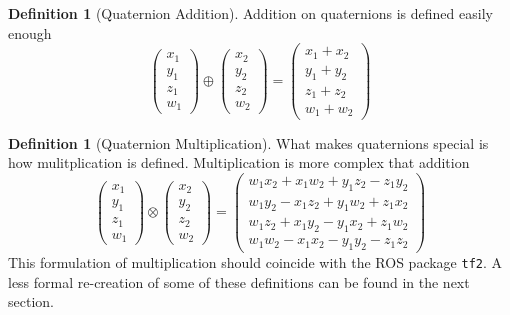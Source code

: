 \documentclass{amsart}
\theoremstyle{definition}
\newtheorem{definition}[theorem]{Definition}
\theoremstyle{remark}
\numberwithin{equation}{section}
\begin{document}
\begin{definition}[Quaternion Addition]
  Addition on quaternions is defined easily enough
  \begin{equation}
    \begin{pmatrix}
      x_1 \\
      y_1 \\
      z_1 \\
      w_1
    \end{pmatrix} \oplus
    \begin{pmatrix}
      x_2 \\
      y_2 \\
      z_2 \\
      w_2
    \end{pmatrix} =
    \begin{pmatrix}
      x_1 + x_2 \\
      y_1 + y_2 \\
      z_1 + z_2 \\
      w_1 + w_2
    \end{pmatrix}
  \end{equation}
\end{definition}
\begin{definition}[Quaternion Multiplication]
  What makes quaternions special is how mulitplication is defined. Multiplication is more complex that addition
  \begin{equation} \label{eqn:multiplication}
    \begin{pmatrix}
      x_1 \\
      y_1 \\
      z_1 \\
      w_1
    \end{pmatrix} \otimes 
    \begin{pmatrix}
      x_2 \\
      y_2 \\
      z_2 \\
      w_2
    \end{pmatrix} =
    \begin{pmatrix}
      w_1x_2 + x_1w_2 + y_1z_2 - z_1y_2 \\
      w_1y_2 - x_1z_2 + y_1w_2 + z_1x_2 \\
      w_1z_2 + x_1y_2 - y_1x_2 + z_1w_2 \\
      w_1w_2 - x_1x_2 - y_1y_2 - z_1z_2
    \end{pmatrix}
  \end{equation}
  This formulation of multiplication should coincide with the ROS package \texttt{tf2}. A less formal re-creation of some of these definitions can be found in the next section.
\end{definition}
\end{document}
